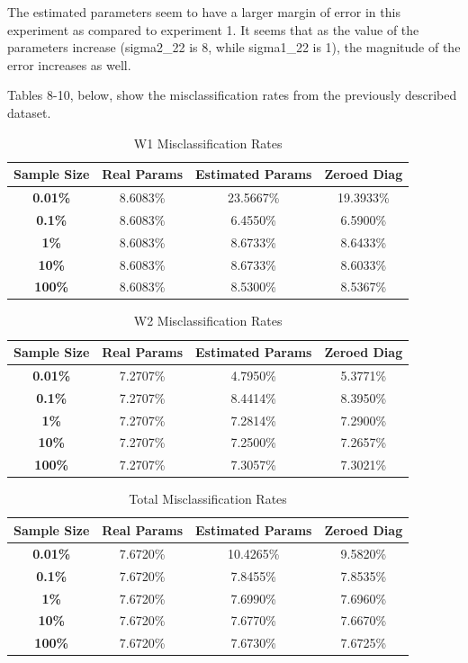 \documentclass{article}
\begin{document}
\noindent The estimated parameters seem to have a larger margin of error in this experiment as compared to experiment 1. It seems that as the value of the parameters increase 
(sigma2\_22 is 8, while sigma1\_22 is 1), the magnitude of the error increases as well. 

Tables 8-10, below, show the misclassification rates from the previously described dataset. 
\begin{table}[H]
\centering
\small
\caption{W1 Misclassification Rates}
\vspace{-0.4em}
\begin{tabular}{cccc}
\toprule
\textbf{Sample Size} & \textbf{Real Params} & \textbf{Estimated Params} & \textbf{Zeroed Diag} \\
\midrule
\textbf{0.01\%} & 8.6083\% & 23.5667\% & 19.3933\% \\
\textbf{0.1\%} & 8.6083\% & 6.4550\% & 6.5900\% \\
\textbf{1\%} & 8.6083\% & 8.6733\% & 8.6433\% \\
\textbf{10\%} & 8.6083\% & 8.6733\% & 8.6033\% \\
\textbf{100\%} & 8.6083\% & 8.5300\% & 8.5367\% \\
\bottomrule
\end{tabular}
\end{table}

\begin{table}[H]
\centering
\small
\caption{W2 Misclassification Rates}
\vspace{-0.4em}
\begin{tabular}{cccc}
\toprule
\textbf{Sample Size} & \textbf{Real Params} & \textbf{Estimated Params} & \textbf{Zeroed Diag} \\
\midrule
\textbf{0.01\%} & 7.2707\% & 4.7950\% & 5.3771\% \\
\textbf{0.1\%} & 7.2707\% & 8.4414\% & 8.3950\% \\
\textbf{1\%} & 7.2707\% & 7.2814\% & 7.2900\% \\
\textbf{10\%} & 7.2707\% & 7.2500\% & 7.2657\% \\
\textbf{100\%} & 7.2707\% & 7.3057\% & 7.3021\% \\
\bottomrule
\end{tabular}
\end{table}

\begin{table}[H]
\centering
\small
\caption{Total Misclassification Rates}
\vspace{-0.4em}
\begin{tabular}{cccc}
\toprule
\textbf{Sample Size} & \textbf{Real Params} & \textbf{Estimated Params} & \textbf{Zeroed Diag} \\
\midrule
\textbf{0.01\%} & 7.6720\% & 10.4265\% & 9.5820\% \\
\textbf{0.1\%} & 7.6720\% & 7.8455\% & 7.8535\% \\
\textbf{1\%} & 7.6720\% & 7.6990\% & 7.6960\% \\
\textbf{10\%} & 7.6720\% & 7.6770\% & 7.6670\% \\
\textbf{100\%} & 7.6720\% & 7.6730\% & 7.6725\% \\
\bottomrule
\end{tabular}
\end{table}
\end{document}

